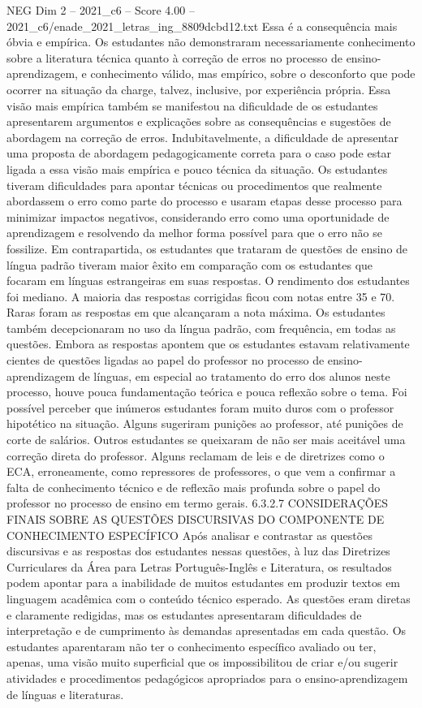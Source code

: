 \begin{textsample}{NEG Dim 2 – 2021\_c6 – Score 4.00 – 2021\_c6/enade\_2021\_letras\_ing\_8809dcbd12.txt}
Essa é a consequência mais óbvia e empírica.
Os estudantes não demonstraram necessariamente conhecimento sobre a literatura técnica quanto à correção de erros no processo de ensino-aprendizagem, e conhecimento válido, mas empírico, sobre o desconforto que pode ocorrer na situação da charge, talvez, inclusive, por experiência própria.
Essa visão mais empírica também se manifestou na dificuldade de os estudantes apresentarem argumentos e explicações sobre as consequências e sugestões de abordagem na correção de erros.
Indubitavelmente, a dificuldade de apresentar uma proposta de abordagem pedagogicamente correta para o caso pode estar ligada a essa visão mais empírica e pouco técnica da situação.
Os estudantes tiveram dificuldades para apontar técnicas ou procedimentos que realmente abordassem o erro como parte do processo e usaram etapas desse processo para minimizar impactos negativos, considerando erro como uma oportunidade de aprendizagem e resolvendo da melhor forma possível para que o erro não se fossilize.
Em contrapartida, os estudantes que trataram de questões de ensino de língua padrão tiveram maior êxito em comparação com os estudantes que focaram em línguas estrangeiras em suas respostas.
O rendimento dos estudantes foi mediano.
A maioria das respostas corrigidas ficou com notas entre 35 e 70.
Raras foram as respostas em que alcançaram a nota máxima.
Os estudantes também decepcionaram no uso da língua padrão, com frequência, em todas as questões.
Embora as respostas apontem que os estudantes estavam relativamente cientes de questões ligadas ao papel do professor no processo de ensino-aprendizagem de línguas, em especial ao tratamento do erro dos alunos neste processo, houve pouca fundamentação teórica e pouca reflexão sobre o tema.
Foi possível perceber que inúmeros estudantes foram muito duros com o professor hipotético na situação.
Alguns sugeriram punições ao professor, até punições de corte de salários.
Outros estudantes se queixaram de não ser mais aceitável uma correção direta do professor.
Alguns reclamam de leis e de diretrizes como o ECA, erroneamente, como repressores de professores, o que vem a confirmar a falta de conhecimento técnico e de reflexão mais profunda sobre o papel do professor no processo de ensino em termo gerais. 6.3.2.7 CONSIDERAÇÕES FINAIS SOBRE AS QUESTÕES DISCURSIVAS DO COMPONENTE DE CONHECIMENTO ESPECÍFICO Após analisar e contrastar as questões discursivas e as respostas dos estudantes nessas questões, à luz das Diretrizes Curriculares da Área para Letras Português-Inglês e Literatura, os resultados podem apontar para a inabilidade de muitos estudantes em produzir textos em linguagem acadêmica com o conteúdo técnico esperado.
As questões eram diretas e claramente redigidas, mas os estudantes apresentaram dificuldades de interpretação e de cumprimento às demandas apresentadas em cada questão.
Os estudantes aparentaram não ter o conhecimento específico avaliado ou ter, apenas, uma visão muito superficial que os impossibilitou de criar e/ou sugerir atividades e procedimentos pedagógicos apropriados para o ensino-aprendizagem de línguas e literaturas.

\end{textsample}

